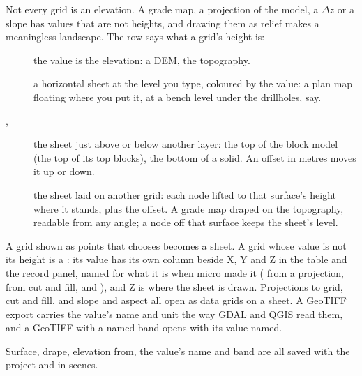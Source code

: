 Not every grid is an elevation. A grade map, a projection of the model, a $\Delta z$ or a slope has values that are not heights, and drawing them as relief makes a meaningless landscape. The  row says what a grid's height is:
\begin{description}
\item[] the value is the elevation: a DEM, the topography.
\item[] a horizontal sheet at the level you type, coloured by the value: a plan map floating where you put it, at a bench level under the drillholes, say.
\item[, ] the sheet just above or below another layer: the top of the block model (the top of its top blocks), the bottom of a solid. An offset in metres moves it up or down.
\item[] the sheet laid on another grid: each node lifted to that surface's height where it stands, plus the offset. A grade map draped on the topography, readable from any angle; a node off that surface keeps the sheet's level.
\end{description}
A grid shown as points that chooses  becomes a sheet. A grid whose value is not its height is a : its value has its own column beside X, Y and Z in the table and the record panel, named for what it is when micro made it ( from a projection,  from cut and fill,  and ), and Z is where the sheet is drawn. Projections to grid, cut and fill, and slope and aspect all open as data grids on a sheet. A GeoTIFF export carries the value's name and unit the way GDAL and QGIS read them, and a GeoTIFF with a named band opens with its value named.

Surface, drape, elevation from, the value's name and band are all saved with the project and in scenes.

